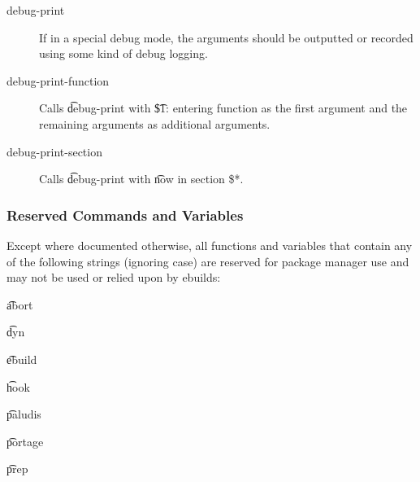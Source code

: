 \begin{description}
\item[debug-print] If in a special debug mode, the arguments should be outputted or recorded using
    some kind of debug logging.
\item[debug-print-function] Calls \t{debug-print} with \t{\$1: entering function} as the first
    argument and the remaining arguments as additional arguments.
\item[debug-print-section] Calls \t{debug-print} with \t{now in section \$*}.
\end{description}

\subsubsection{Reserved Commands and Variables}

Except where documented otherwise, all functions and variables that contain any of the following
strings (ignoring case) are reserved for package manager use and may not be used or relied upon by
ebuilds:

\begin{compactitem}
\item \t{abort}
\item \t{dyn}
\item \t{ebuild}
\item \t{hook}
\item \t{paludis}
\item \t{portage}
\item \t{prep}
\end{compactitem}


